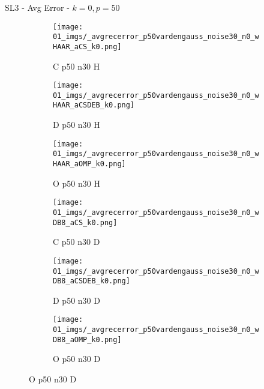 \begin{frame}{SL3 - Avg Error - $k=0,p=50$}{}
\begin{figure}
\vspace{5pt}

\begin{subfigure}{0.13\textwidth}
\texttt{[image: 01\_imgs/\_avgrecerror\_p50vardengauss\_noise30\_n0\_wHAAR\_aCS\_k0.png]}
\caption*{\tiny C p50 n30 H}
\end{subfigure}
\begin{subfigure}{0.13\textwidth}
\texttt{[image: 01\_imgs/\_avgrecerror\_p50vardengauss\_noise30\_n0\_wHAAR\_aCSDEB\_k0.png]}
\caption*{\tiny D p50 n30 H}
\end{subfigure}
\begin{subfigure}{0.13\textwidth}
\texttt{[image: 01\_imgs/\_avgrecerror\_p50vardengauss\_noise30\_n0\_wHAAR\_aOMP\_k0.png]}
\caption*{\tiny O p50 n30 H}
\end{subfigure}
\begin{subfigure}{0.13\textwidth}
\texttt{[image: 01\_imgs/\_avgrecerror\_p50vardengauss\_noise30\_n0\_wDB8\_aCS\_k0.png]}
\caption*{\tiny C p50 n30 D}
\end{subfigure}
\begin{subfigure}{0.13\textwidth}
\texttt{[image: 01\_imgs/\_avgrecerror\_p50vardengauss\_noise30\_n0\_wDB8\_aCSDEB\_k0.png]}
\caption*{\tiny D p50 n30 D}
\end{subfigure}
\begin{subfigure}{0.13\textwidth}
\texttt{[image: 01\_imgs/\_avgrecerror\_p50vardengauss\_noise30\_n0\_wDB8\_aOMP\_k0.png]}
\caption*{\tiny O p50 n30 D}
\end{subfigure}
\end{figure}
\end{frame}


